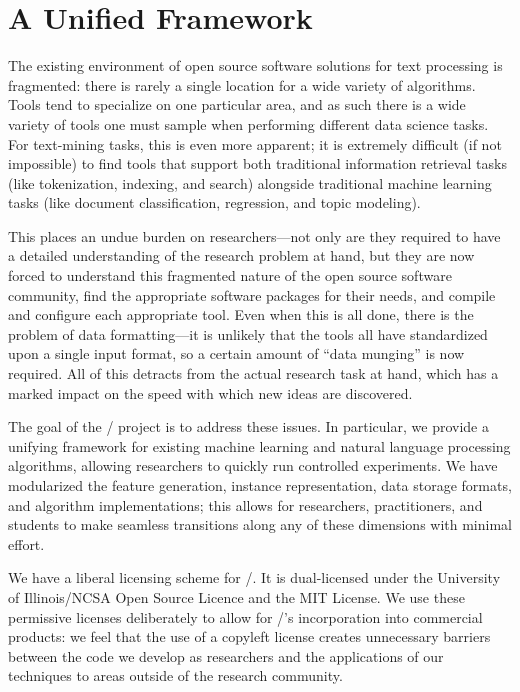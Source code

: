 \section{A Unified Framework}

The existing environment of open source software solutions for text processing
is fragmented: there is rarely a single location for a wide variety of
algorithms. Tools tend to specialize on one particular area, and as such there
is a wide variety of tools one must sample when performing different data
science tasks. For text-mining tasks, this is even more apparent; it is
extremely difficult (if not impossible) to find tools that support both
traditional information retrieval tasks (like tokenization, indexing, and
search) alongside traditional machine learning tasks (like document
classification, regression, and topic modeling).

This places an undue burden on researchers---not only are they required to have
a detailed understanding of the research problem at hand, but they are now
forced to understand this fragmented nature of the open source software
community, find the appropriate software packages for their needs, and compile
and configure each appropriate tool. Even when this is all done, there is the
problem of data formatting---it is unlikely that the tools all have standardized
upon a single input format, so a certain amount of ``data munging'' is now
required. All of this detracts from the actual research task at hand, which has
a marked impact on the speed with which new ideas are discovered.

The goal of the \meta/ project is to address these issues. In particular, we
provide a unifying framework for existing machine learning and natural language
processing algorithms, allowing researchers to quickly run controlled
experiments. We have modularized the feature generation, instance
representation, data storage formats, and algorithm implementations; this allows
for researchers, practitioners, and students to make seamless transitions along
any of these dimensions with minimal effort.

We have a liberal licensing scheme for \meta/. It is dual-licensed under the
University of Illinois/NCSA Open Source Licence and the MIT License. We use
these permissive licenses deliberately to allow for \meta/'s incorporation into
commercial products: we feel that the use of a copyleft license creates
unnecessary barriers between the code we develop as researchers and the
applications of our techniques to areas outside of the research community.

